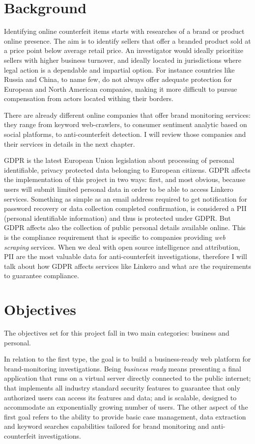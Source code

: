 \section{Background}
Identifying online counterfeit items starts with researches of a brand or
product online presence. The aim is to identify sellers that offer a branded
product sold at a price point below average retail price. An investigator would
ideally prioritize sellers with higher business turnover, and ideally located in
jurisdictions where legal action is a dependable and impartial option. For
instance countries like Russia and China, to name few, do not always offer
adequate protection for European and North American companies, making it more difficult to pursue
compensation from actors located withing their borders.

There are already different online companies that offer brand monitoring
services: they range from keyword web-crawlers, to consumer sentiment analytic
based on social platforms, to anti-counterfeit detection. I will review those
companies and their services in details in the next chapter.

GDPR is the latest European Union legislation about processing of personal
identifiable, privacy protected data belonging to European citizens. GDPR
affects the implementation of this project in two ways: first, and most obvious,
because users will submit limited personal data in order to be able to access
Linkero services. Something as simple as an email address required to get
notification for password recovery or data collection completed confirmation, is
considered a PII (personal identifiable information) and thus is protected under
GDPR. But GDPR affects also the collection of public personal details available
online. This is the compliance requirement that is specific to companies
providing \emph{web scraping} services. When we deal with open source
intelligence and attribution, PII are the most valuable data for
anti-counterfeit investigations, therefore I will talk about how GDPR affects
services like Linkero and what are the requirements to guarantee compliance.


\section{Objectives}
The objectives set for this project fall in two main categories: business
and personal.

In relation to the first type, the goal is to build a business-ready web
platform for brand-monitoring investigations. Being \emph{business ready}
means presenting a final application that runs on a virtual server directly
connected to the public internet; that implements all industry standard
security features to guarantee that only authorized users can access its
features and data; and is scalable, designed to accommodate an exponentially
growing number of users. The other aspect of the first goal refers to the ability to
provide basic case management, data extraction and keyword searches capabilities
tailored for brand monitoring and anti-counterfeit investigations.

